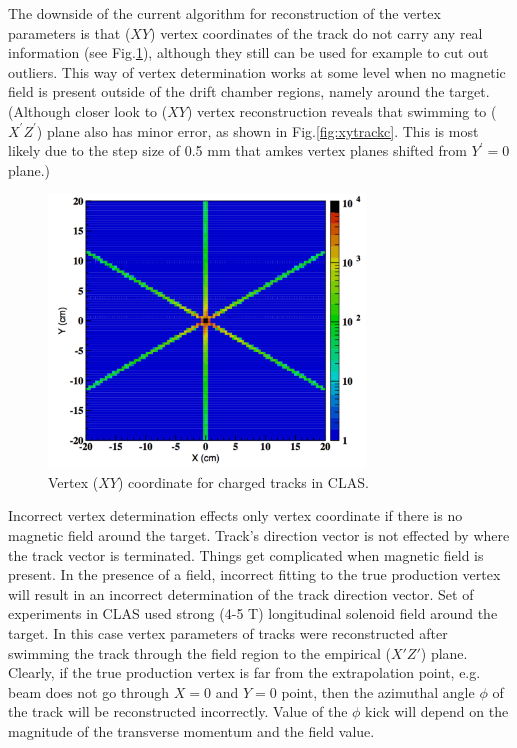 \documentclass[12pt]{article}
\begin{document}
The downside of the current algorithm for reconstruction of the vertex parameters is that ($XY$) vertex coordinates of the track do not carry any real information (see Fig.\ref{fig:xytrack}), although they still can be used for example to cut out outliers. This way of vertex determination works at some level when no magnetic field is present outside of the drift chamber regions, namely around the target. (Although closer look to ($XY$) vertex reconstruction reveals that swimming to ($X^\prime Z^\prime$) plane also has minor error, as shown in Fig.\ref{fig:xytrackc}. This is most likely due to the step size of 0.5 mm that amkes vertex planes shifted from $Y^\prime =0$ plane.) 
\begin{figure}[htb]
\begin{center}
\includegraphics[width=0.75\textwidth]{track_xy}
\caption{Vertex ($XY$) coordinate for charged tracks in CLAS.}
\label{fig:xytrack}
\end{center}
\end{figure}

Incorrect vertex determination effects only vertex coordinate if there is no magnetic field around the target. Track's direction vector is not effected by where the track vector is terminated. Things get complicated when magnetic field is present. In the presence of a field, incorrect fitting to the true production vertex will result in an incorrect determination of the track direction vector. Set of experiments in CLAS used strong (4-5 T) longitudinal solenoid field around the target. In this case vertex parameters of tracks were reconstructed after swimming the track through the field region to the empirical ($X'Z'$) plane. Clearly, if the true production vertex is far from the extrapolation point, e.g. beam does not go through $X=0$ and $Y=0$ point, then the azimuthal angle $\phi$ of the track will be reconstructed incorrectly. Value of the $\phi$ kick will depend on the magnitude of the transverse momentum and the field value. 
\end{document}
